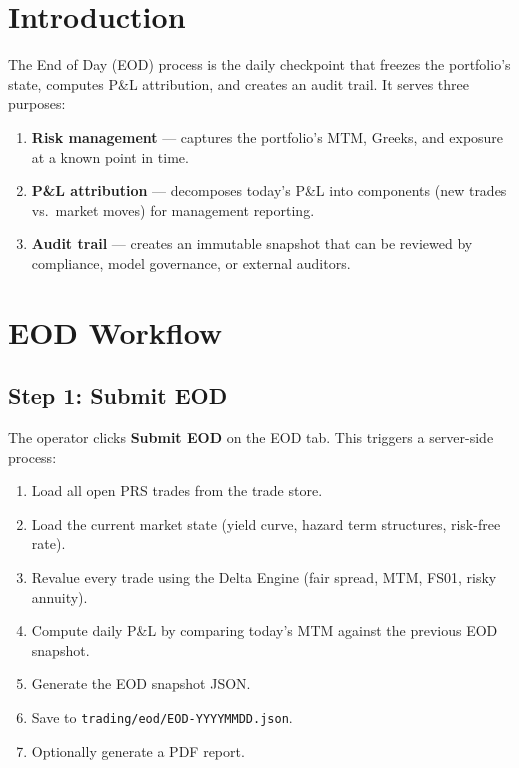 \documentclass[11pt,a4paper]{article}
\begin{document}
\mkmtitlepage
\mkmlegalpage

\tableofcontents
\clearpage


\section{Introduction}

The End of Day (EOD) process is the daily checkpoint that freezes the
portfolio's state, computes P\&L attribution, and creates an audit trail.
It serves three purposes:

\begin{enumerate}
  \item \textbf{Risk management} --- captures the portfolio's MTM,
        Greeks, and exposure at a known point in time.
  \item \textbf{P\&L attribution} --- decomposes today's P\&L into
        components (new trades vs.\ market moves) for management
        reporting.
  \item \textbf{Audit trail} --- creates an immutable snapshot that
        can be reviewed by compliance, model governance, or external
        auditors.
\end{enumerate}


\section{EOD Workflow}

\subsection{Step 1: Submit EOD}

The operator clicks \textbf{Submit EOD} on the EOD tab.  This triggers
a server-side process:

\begin{enumerate}
  \item Load all open PRS trades from the trade store.
  \item Load the current market state (yield curve, hazard term
        structures, risk-free rate).
  \item Revalue every trade using the Delta Engine (fair spread,
        MTM, FS01, risky annuity).
  \item Compute daily P\&L by comparing today's MTM against the
        previous EOD snapshot.
  \item Generate the EOD snapshot JSON.
  \item Save to \texttt{trading/eod/EOD-YYYYMMDD.json}.
  \item Optionally generate a PDF report.
\end{enumerate}
\end{document}
